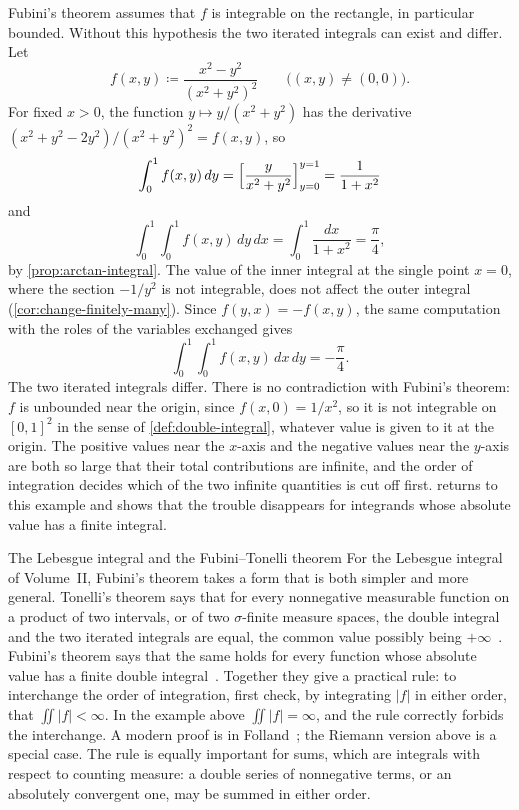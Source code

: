 Fubini's theorem assumes that $f$ is integrable on the rectangle, in particular bounded. Without this hypothesis the two iterated integrals can exist and differ. Let
\[
f(x,y)\coloneqq\frac{x^2-y^2}{(x^2+y^2)^2}\qquad\bigl((x,y)\ne(0,0)\bigr).
\]
For fixed $x>0$, the function $y\mapsto y/(x^2+y^2)$ has the derivative $(x^2+y^2-2y^2)/(x^2+y^2)^2=f(x,y)$, so
\[
\int_0^1f(x,y)\,dy=\Bigl[\frac y{x^2+y^2}\Bigr]_{y=0}^{y=1}=\frac1{1+x^2}
\]
and
\[
\int_0^1\int_0^1f(x,y)\,dy\,dx=\int_0^1\frac{dx}{1+x^2}=\frac\pi4 ,
\]
by \cref{prop:arctan-integral}. The value of the inner integral at the single point $x=0$, where the section $-1/y^2$ is not integrable, does not affect the outer integral (\cref{cor:change-finitely-many}). Since $f(y,x)=-f(x,y)$, the same computation with the roles of the variables exchanged gives
\[
\int_0^1\int_0^1f(x,y)\,dx\,dy=-\frac\pi4 .
\]
The two iterated integrals differ. There is no contradiction with Fubini's theorem: $f$ is unbounded near the origin, since $f(x,0)=1/x^2$, so it is not integrable on $[0,1]^2$ in the sense of \cref{def:double-integral}, whatever value is given to it at the origin. The positive values near the $x$-axis and the negative values near the $y$-axis are both so large that their total contributions are infinite, and the order of integration decides which of the two infinite quantities is cut off first.  returns to this example and shows that the trouble disappears for integrands whose absolute value has a finite integral.

\begin{note}{The Lebesgue integral and the Fubini--Tonelli theorem}
For the Lebesgue integral of Volume~II, Fubini's theorem takes a form that is both simpler and more general. Tonelli's theorem says that for every nonnegative measurable function on a product of two intervals, or of two $\sigma$-finite measure spaces, the double integral and the two iterated integrals are equal, the common value possibly being $+\infty$~\cite{tonelli1909}. Fubini's theorem says that the same holds for every function whose absolute value has a finite double integral~\cite{fubini1907}. Together they give a practical rule: to interchange the order of integration, first check, by integrating $|f|$ in either order, that $\iint|f|<\infty$. In the example above $\iint|f|=\infty$, and the rule correctly forbids the interchange. A modern proof is in Folland~\cite[Sect.~2.5]{folland1999}; the Riemann version above is a special case. The rule is equally important for sums, which are integrals with respect to counting measure: a double series of nonnegative terms, or an absolutely convergent one, may be summed in either order.
\end{note}

